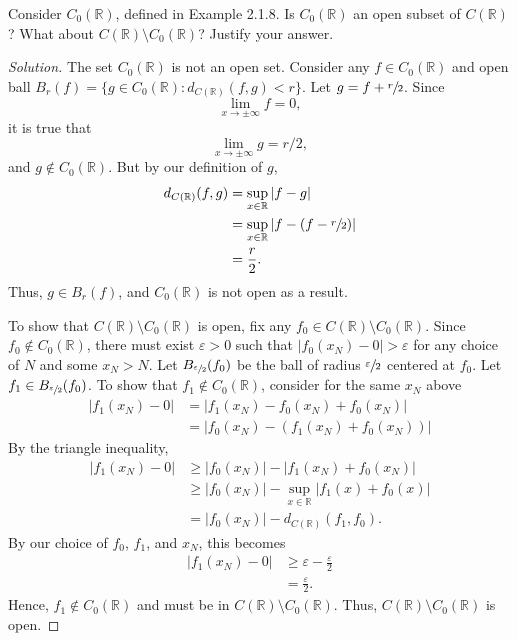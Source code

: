 \documentclass[11pt,letterpaper]{article}
\newcommand{\R}{\mathbb{R}}
\newcommand{\eps}{\varepsilon}
\renewcommand{\epsilon}{\eps}
\newenvironment{prob}[1]
  {\renewcommand\theinnerprob{#1}\innerprob}
  {\endinnerprob}
\newenvironment{solution}
  {\renewcommand\qedsymbol{}\begin{proof}[Solution]}
  {\end{proof}\bigskip}
\begin{document}
\begin{prob}{5} %
Consider $C_0(\R)$, defined in Example 2.1.8.  Is $C_0(\R)$ an open subset of $C(\R)$?  What about $C(\R) \setminus C_0(\R)$?  Justify your answer.
\end{prob}
\begin{solution}
	The set $C_0(\R)$ is not an open set. Consider any $f\in C_0(\R)$ and open ball $B_r(f) = \{g \in C_0(\R): d_{C(\R)}(f,g) < r\}$. Let $g = f + \sfrac{r}{2}$. Since $$\lim_{x\to \pm \infty}f = 0,$$ it is true that $$\lim_{x\to \pm \infty}g = r/2,$$ and $g\notin C_0(\R)$. But by our definition of $g$, 
	\[\begin{split}
		d_{C(\R)}(f,g) &= \sup_{x\in \R} |f-g|\\
		&=\sup_{x\in \R} |f-(f-\sfrac{r}{2})|\\
		&= \frac{r}{2}.
	\end{split}\]
	Thus, $g\in B_r(f)$, and $C_0(\R)$ is not open as a result.
	
	To show that $C(\R) \setminus C_0(\R)$ is open, fix any $f_0\in C(\R) \setminus C_0(\R)$. Since $f_0\notin C_0(\R)$, there must exist $\epsilon > 0$ such that $|f_0(x_N)-0| > \epsilon$ for any choice of $N$ and some $x_N>N$. Let $B_{\sfrac{\epsilon}{2}}(f_0)$ be the ball of radius $\sfrac{\epsilon}{2}$ centered at $f_0$. Let $f_1 \in B_{\sfrac{\epsilon}{2}}(f_0)$. To show that $f_1 \notin C_0(\R)$, consider for the same $x_N$ above
	\[\begin{split}
		|f_1(x_N) - 0| & = |f_1(x_N) - f_0(x_N) + f_0(x_N)|\\
		& = |f_0(x_N) - (f_1(x_N) + f_0(x_N))|
	\end{split}\]
	By the triangle inequality,
	\[\begin{split}
		|f_1(x_N) - 0| & \geq |f_0(x_N)| - |f_1(x_N) + f_0(x_N)|\\
		& \geq |f_0(x_N)| - \sup_{x\in \R}|f_1(x) + f_0(x)|\\
		&= |f_0(x_N)| - d_{C(\R)}(f_1, f_0).
	\end{split}\]
	By our choice of $f_0$, $f_1$, and $x_N$, this becomes
	\[\begin{split}
		|f_1(x_N) - 0| & \geq \epsilon - \frac{\epsilon}{2}\\
		& = \frac{\epsilon}{2}.
	\end{split}\]
	Hence, $f_1 \notin C_0(\R)$ and must be in $C(\R) \setminus C_0(\R)$. Thus, $C(\R) \setminus C_0(\R)$ is open.
\end{solution}
\newpage
\end{document}
